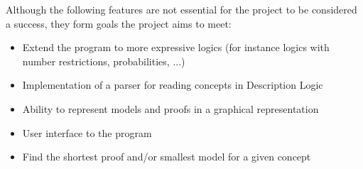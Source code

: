 
Although the following features are not essential for the project to be considered a success, they
form goals the project aims to meet:

\begin{itemize}
\item Extend the program to more expressive logics (for instance logics with number restrictions, probabilities, ...)
\item Implementation of a parser for reading concepts in Description Logic
\item Ability to represent models and proofs in a graphical representation
\item User interface to the program
\item Find the shortest proof and/or smallest model for a given concept
\end{itemize}
